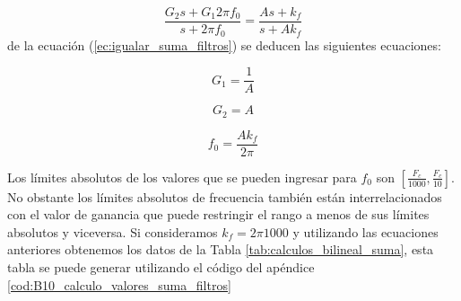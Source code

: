 	\begin{equation}
		\frac{G_{2}s + G_{1}2 \pi f_{0}}{s + 2 \pi f_{0}} = \frac{As + k_{f}}{s + Ak_{f}}
		\label{ec:igualar_suma_filtros}
	\end{equation}
	de la ecuación (\ref{ec:igualar_suma_filtros}) se deducen las siguientes ecuaciones:
	
	\begin{equation}
		G_{1} = \frac{1}{A}
	\end{equation}	
	
	\begin{equation}
		G_{2} = A
	\end{equation}
	
	\begin{equation}
		f_{0} = \frac{A k_{f}}{2 \pi}
	\end{equation}
	
	Los límites absolutos de los valores que se pueden ingresar para $f_{0}$ son $[\frac{F_{c}}{1000}, \frac{F_{c}}{10}]$. No obstante los límites absolutos de frecuencia también están interrelacionados con el valor de ganancia que puede restringir el rango a menos de sus límites absolutos y viceversa. Si consideramos $k_{f} = 2 \pi 1000$ y utilizando las ecuaciones anteriores obtenemos los datos de la Tabla \ref{tab:calculos_bilineal_suma}, esta tabla se puede generar utilizando el código del apéndice \ref{cod:B10_calculo_valores_suma_filtros}

